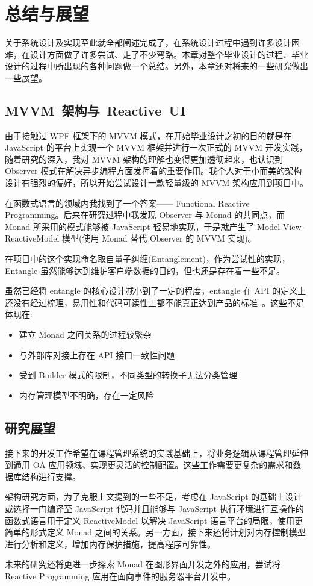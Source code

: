 \chapter{总结与展望}

关于系统设计及实现至此就全部阐述完成了，在系统设计过程中遇到许多设计困难，在设计方面做了许多尝试、走了不少弯路。本章对整个毕业设计的过程、毕业设计的过程中所出现的各种问题做一个总结。另外，本章还对将来的一些研究做出一些展望。

\section{MVVM~架构与~Reactive~UI}

由于接触过 WPF 框架下的 MVVM 模式，在开始毕业设计之初的目的就是在 JavaScript 的平台上实现一个 MVVM 框架并进行一次正式的 MVVM 开发实践，随着研究的深入，我对 MVVM 架构的理解也变得更加透彻起来，也认识到 Observer 模式在解决异步编程方面发挥着的重要作用。我个人对于小而美的架构设计有强烈的偏好，所以开始尝试设计一款轻量级的 MVVM 架构应用到项目中。

在函数式语言的领域内我找到了一个答案—— Functional Reactive Programming。后来在研究过程中我发现 Observer 与 Monad 的共同点，而 Monad 所采用的模式能够被 JavaScript 轻易地实现，于是就产生了 Model-View-ReactiveModel 模型(使用 Monad 替代 Observer 的 MVVM 实现)。

在项目中的这个实现命名取自量子纠缠(Entanglement)，作为尝试性的实现，Entangle 虽然能够达到维护客户端数据的目的，但也还是存在着一些不足。

虽然已经将 entangle 的核心设计减小到了一定的程度，entangle 在 API 的定义上还没有经过梳理，易用性和代码可读性上都不能真正达到产品的标准~\cite{Gerken:2010:UCM:1753846.1754082}。这些不足体现在:

\begin{itemize}
  \item 建立 Monad 之间关系的过程较繁杂
  \item 与外部库对接上存在 API 接口一致性问题
  \item 受到 Builder 模式的限制，不同类型的转换子无法分类管理
  \item 内存管理模型不明确，存在一定风险
\end{itemize}

\section{研究展望}

接下来的开发工作希望在课程管理系统的实践基础上，将业务逻辑从课程管理延伸到通用 OA 应用领域、实现更灵活的控制配置。这些工作需要更复杂的需求和数据库结构进行支撑。

架构研究方面，为了克服上文提到的一些不足，考虑在 JavaScript 的基础上设计或选择一门编译至 JavaScript 代码并且能够与 JavaScript 执行环境进行互操作的函数式语言用于定义 ReactiveModel 以解决 JavaScript 语言平台的局限，使用更简单的形式定义 Monad 之间的关系。另一方面，接下来还将计划对内存控制模型进行分析和定义，增加内存保护措施，提高程序可靠性。

未来的研究还将更进一步探索 Monad 在图形界面开发之外的应用，尝试将 Reactive Programming 应用在面向事件的服务器平台开发中。

